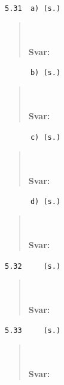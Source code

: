 \documentclass[a4paper]{article}
\newcommand{\tskcol}[1]{\textcolor{tskcol}{#1}}
\begin{document}
	\texttt{\tskcol{5.31~~a) (s.)}}
	\begin{quotation}
		\noindent
		\\ \\
		\textbf{Svar:}
	\end{quotation}
	
	\texttt{\tskcol{~~~~~~b) (s.)}}
	\begin{quotation}
		\noindent
		\\ \\
		\textbf{Svar:}
	\end{quotation}
	
	\texttt{\tskcol{~~~~~~c) (s.)}}
	\begin{quotation}
		\noindent
		\\ \\
		\textbf{Svar:}
	\end{quotation}
	
	\texttt{\tskcol{~~~~~~d) (s.)}}
	\begin{quotation}
		\noindent
		\\ \\
		\textbf{Svar:}
	\end{quotation}
	
	\texttt{\tskcol{5.32~~~~ (s.)}}
	\begin{quotation}
		\noindent
		\\ \\
		\textbf{Svar:}
	\end{quotation}
	
	\texttt{\tskcol{5.33~~~~ (s.)}}
	\begin{quotation}
		\noindent
		\\ \\
		\textbf{Svar:}
	\end{quotation}
\end{document}
